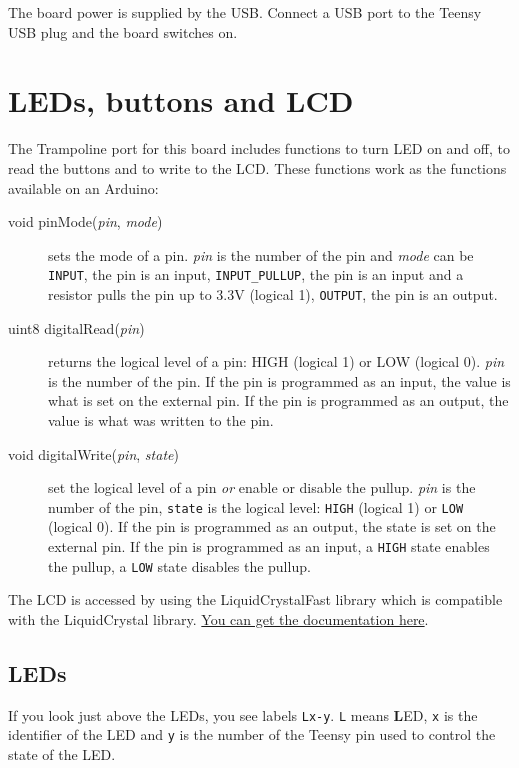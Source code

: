 \documentclass[11pt]{report}
\begin{document}
The board power is supplied by the USB. Connect a USB  port to the Teensy USB plug and the board switches on.

\section{LEDs, buttons and LCD}

The Trampoline port for this board includes functions to turn LED on and off, to read the buttons and to write to the LCD. These functions work as the functions available on an Arduino:

\begin{description}

\item[void pinMode({\it pin}, {\it mode})] sets the mode of a pin. {\it pin} is the number of the pin and {\it mode} can be {\tt INPUT}, the pin is an input, {\tt INPUT_PULLUP}, the pin is an input and a resistor pulls the pin up to 3.3V (logical 1), {\tt OUTPUT}, the pin is an output.

\item[uint8 digitalRead({\it pin})] returns the logical level of a pin: HIGH (logical 1) or LOW (logical 0). {\it pin} is the number of the pin. If the pin is programmed as an input, the value is what is set on the external pin. If the pin is programmed as an output, the value is what was written to the pin.

\item[void digitalWrite({\it pin}, {\it state})] set the logical level of a pin \emph{or} enable or disable the pullup. {\it pin} is the number of the pin, {\tt state} is the logical level:  {\tt HIGH} (logical 1) or {\tt LOW} (logical 0). If the pin is programmed as an output, the state is set on the external pin. If the pin is programmed as an input, a {\tt HIGH} state enables the pullup, a {\tt LOW} state disables the pullup.

\end{description}

The LCD is accessed by using the LiquidCrystalFast library which is compatible with the LiquidCrystal library. \href{https://www.arduino.cc/en/Reference/LiquidCrystal}{You can get the documentation here}.

\subsection{LEDs}

If you look just above the LEDs, you see labels {\tt Lx-y}. {\tt L} means {\bf L}ED, {\tt x} is the identifier of the LED and {\tt y} is the number of the Teensy pin  used to control the state of the LED.
\end{document}
